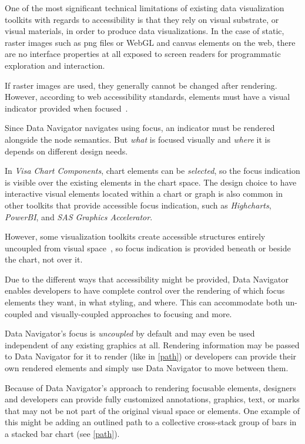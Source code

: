 \documentclass[journal]{vgtc}                %
\begin{document}
One of the most significant technical limitations of existing data visualization toolkits with regards to accessibility is that they rely on visual substrate, or visual materials, in order to produce data visualizations. In the case of static, raster images such as png files or WebGL and canvas elements on the web, there are no interface properties at all exposed to screen readers for programmatic exploration and interaction.

If raster images are used, they generally cannot be changed after rendering. However, according to web accessibility standards, elements must have a visual indicator provided when focused~\cite{WAI2016Focus}.

Since Data Navigator navigates using focus, an indicator must be rendered alongside the node semantics. But \textit{what} is focused visually and \textit{where} it is depends on different design needs.

In \textit{Visa Chart Components}, chart elements can be \textit{selected}, so the focus indication is visible over the existing elements in the chart space. The design choice to have interactive visual elements located within a chart or graph is also common in other toolkits that provide accessible focus indication, such as \textit{Highcharts}, \textit{PowerBI}, and \textit{SAS Graphics Accelerator}.

However, some visualization toolkits create accessible structures entirely uncoupled from visual space~\cite{Blanco2022olli}, so focus indication is provided beneath or beside the chart, not over it.

Due to the different ways that accessibility might be provided, Data Navigator enables developers to have complete control over the rendering of which focus elements they want, in what styling, and where. This can accommodate both un-coupled and visually-coupled approaches to focusing and more.

Data Navigator's focus is \textit{uncoupled} by default and may even be used independent of any existing graphics at all. Rendering information may be passed to Data Navigator for it to render (like in \autoref{path}) or developers can provide their own rendered elements and simply use Data Navigator to move between them.

Because of Data Navigator's approach to rendering focusable elements, designers and developers can provide fully customized annotations, graphics, text, or marks that may not be not part of the original visual space or elements. One example of this might be adding an outlined path to a collective cross-stack group of bars in a stacked bar chart (see \autoref{path}).
\end{document}
